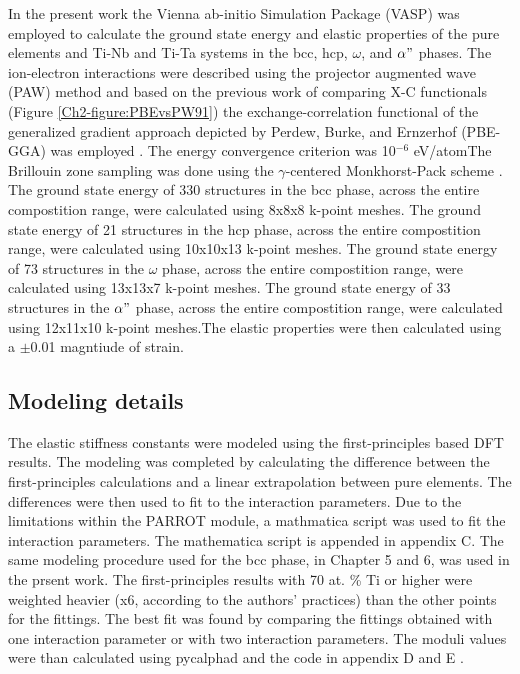 In the present work the Vienna ab-initio Simulation Package (VASP) \cite{Kresse1996} was employed to calculate the ground state energy and elastic properties of the pure elements and Ti-Nb and Ti-Ta systems in the bcc, hcp, $\omega$, and $\alpha"$ phases. The ion-electron interactions were described using the projector augmented wave (PAW) \cite{Kresse1999,Blochl1994} method and based on the previous work of comparing X-C functionals (Figure \ref{Ch2-figure:PBEvsPW91}) the exchange-correlation functional of the generalized gradient approach depicted by Perdew, Burke, and Ernzerhof (PBE-GGA) was employed \cite{Perdew1996a}. The energy convergence criterion was 10$^{-6}$ eV/atomThe Brillouin zone sampling was done using the $\gamma$-centered Monkhorst-Pack scheme \cite{Monkhorst1976a}. The ground state energy of 330 structures in the bcc phase, across the entire compostition range, were calculated using 8x8x8 k-point meshes. The ground state energy of 21 structures in the hcp phase, across the entire compostition range, were calculated using 10x10x13 k-point meshes. The ground state energy of 73 structures in the $\omega$ phase, across the entire compostition range, were calculated using 13x13x7 k-point meshes. The ground state energy of 33 structures in the $\alpha"$ phase, across the entire compostition range, were calculated using 12x11x10 k-point meshes.The elastic properties were then calculated using a $\pm$0.01 magntiude of strain.

\subsection{Modeling details}

The elastic stiffness constants were modeled using the first-principles based DFT results. The modeling was completed by calculating the difference between the first-principles calculations and a linear extrapolation between pure elements. The differences were then used to fit to the interaction parameters. Due to the limitations within the PARROT module, a mathmatica script was used to fit the interaction parameters. The mathematica script is appended in appendix C. The same modeling procedure used for the bcc phase, in Chapter 5 and 6, was used in the prsent work. The first-principles results with 70 at. \% Ti or higher were weighted heavier (x6, according to the authors' practices) than the other points for the fittings. The best fit was found by comparing the fittings obtained with one interaction parameter or with two interaction parameters. The moduli values were than calculated using pycalphad and the code in appendix D and E \cite{Otis2017}.

